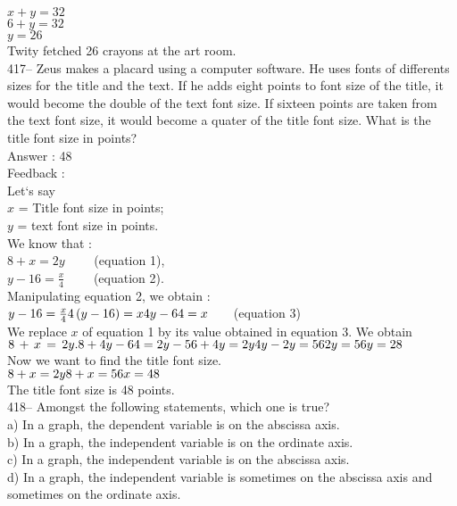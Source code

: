 \documentclass[letterpaper, 12pt]{article}
\begin{document}
$x+y=32$\\
$6+y=32$\\
$y=26$\\

Twity fetched 26 crayons at the art room.\\

417-- Zeus makes a placard using a computer software. He uses fonts of differents sizes for the title and the text.
  If he adds eight points to font size of the title, it would become the double of the text font size. If sixteen points are taken from the text font size, it would become a quater of the title font size. What is the title font size in points?\\

Answer : 48\\

Feedback : \\
Let`s say\\
$x$ = Title font size in points;\\
$y$ = text font size in points.\\

We know that : \\
$8+x=2y \qquad $ (equation 1),\\
$y-16=\frac{x}{4} \qquad$ (equation 2).\\

Manipulating equation 2, we obtain :\\
$y-16=\frac{x}{4}\\
4\left( y-16\right) =x\\
4y-64=x \qquad $(equation 3)\\

We replace $x$ of equation 1 by its value obtained in equation 3.
We obtain $8\,+\,x\,=\,2y.\\
8+4y-64=2y\\
-56+4y=2y\\
4y-2y=56\\
2y=56\\
y=28$\\

Now we want to find the title font size.\\
$8+x=2y\\
8+x=56\\
x=48$\\

The title font size is 48 points.\\


418-- Amongst the following statements, which one is true?\\
a) In a graph, the dependent variable is on the abscissa axis.\\
b) In a graph, the independent variable is on the ordinate axis.\\
c) In a graph, the independent variable is on the abscissa axis.\\
d) In a graph, the independent variable is sometimes on the abscissa axis and sometimes on the ordinate axis.\\
\end{document}
